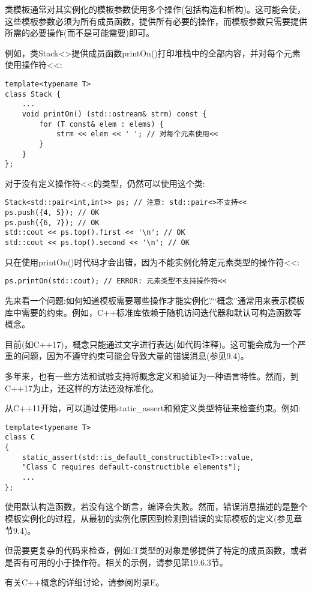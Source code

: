 
类模板通常对其实例化的模板参数使用多个操作(包括构造和析构)。这可能会使，这些模板参数必须为所有成员函数，提供所有必要的操作，而模板参数只需要提供所需的必要操作(而不是可能需要)即可。

例如，类Stack<>提供成员函数printOn()打印堆栈中的全部内容，并对每个元素使用操作符<{}<:

\begin{lstlisting}[style=styleCXX]
template<typename T>
class Stack {
	...
	void printOn() (std::ostream& strm) const {
		for (T const& elem : elems) {
			strm << elem << ' '; // 对每个元素使用<<
		}
	}
};
\end{lstlisting}

对于没有定义操作符<{}<的类型，仍然可以使用这个类:

\begin{lstlisting}[style=styleCXX]
Stack<std::pair<int,int>> ps; // 注意: std::pair<>不支持<<
ps.push({4, 5}); // OK
ps.push({6, 7}); // OK
std::cout << ps.top().first << '\n'; // OK
std::cout << ps.top().second << '\n'; // OK
\end{lstlisting}

只在使用printOn()时代码才会出错，因为不能实例化特定元素类型的操作符<{}<:

\begin{lstlisting}[style=styleCXX]
ps.printOn(std::cout); // ERROR: 元素类型不支持操作符<<
\end{lstlisting}


先来看一个问题:如何知道模板需要哪些操作才能实例化?“概念”通常用来表示模板库中需要的约束。例如，C++标准库依赖于随机访问迭代器和默认可构造函数等概念。

目前(如C++17)，概念只能通过文字进行表达(如代码注释)。这可能会成为一个严重的问题，因为不遵守约束可能会导致大量的错误消息(参见9.4)。

多年来，也有一些方法和试验支持将概念定义和验证为一种语言特性。然而，到C++17为止，还这样的方法还没标准化。

从C++11开始，可以通过使用static\_assert和预定义类型特征来检查约束。例如:

\begin{lstlisting}[style=styleCXX]
template<typename T>
class C
{
	static_assert(std::is_default_constructible<T>::value,
	"Class C requires default-constructible elements");
	...
};
\end{lstlisting}

使用默认构造函数，若没有这个断言，编译会失败。然而，错误消息描述的是整个模板实例化的过程，从最初的实例化原因到检测到错误的实际模板的定义(参见章节9.4)。

但需要更复杂的代码来检查，例如:T类型的对象是够提供了特定的成员函数，或者是否有可用的小于操作符。相关的示例，请参见第19.6.3节。

有关C++概念的详细讨论，请参阅附录E。















